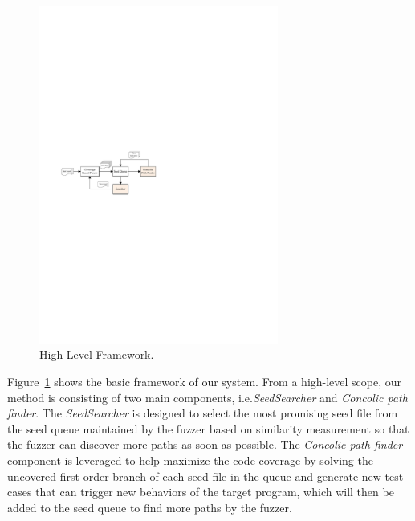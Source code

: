 \begin{figure}
\centering
\includegraphics[width=0.7\textwidth]{figures/framework.pdf} 
\caption{High Level Framework.}\label{Framework}
\end{figure}

Figure~\ref{Framework} shows the basic framework of our system. 
From a high-level scope, our method is consisting of two main components, i.e.\emph{SeedSearcher} and \emph{Concolic path finder}. The \emph{SeedSearcher} is designed to select the most promising seed file from the seed queue maintained by the fuzzer based on similarity measurement so that the fuzzer can discover more paths as soon as possible. The \emph{Concolic path finder} component is leveraged to help maximize the code coverage by solving the uncovered first order branch of each seed file in the queue and generate new test cases that can trigger new behaviors of the target program, which will then be added to the seed queue to find more paths by the fuzzer.
